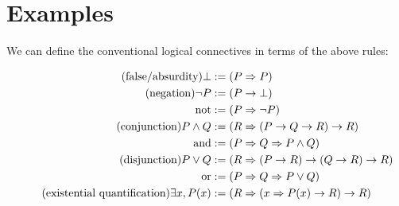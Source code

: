 \documentclass{article}
\begin{document}
  \section{Examples}\label{structure}

  We can define the conventional logical connectives in terms of the above rules:

  \setlength{\jot}{0.4em}
  \begin{align*}
    \tag{false/absurdity}
    \bot &:= (P \Rightarrow{P})\\
    \tag{negation}
    \neg P &:= ({P \rightarrow \bot})\\
    \mathrm{not} &:= (P \Rightarrow \neg P)\\
    \tag{conjunction}
    P \land Q &:= (R \Rightarrow (P \rightarrow Q \rightarrow R) \rightarrow R)\\
    \mathrm{and} &:= (P \Rightarrow Q \Rightarrow P \land Q)\\
    \tag{disjunction}
    P \lor Q &:= (R \Rightarrow (P \rightarrow R) \rightarrow (Q \rightarrow R) \rightarrow R)\\
    \mathrm{or} &:= (P \Rightarrow Q \Rightarrow P \lor Q)\\
    \tag{existential quantification}
    \exists x, P(x) &:= (R \Rightarrow (x \Rightarrow P(x) \rightarrow R) \rightarrow R)\\
  \end{align*}


\end{document}

